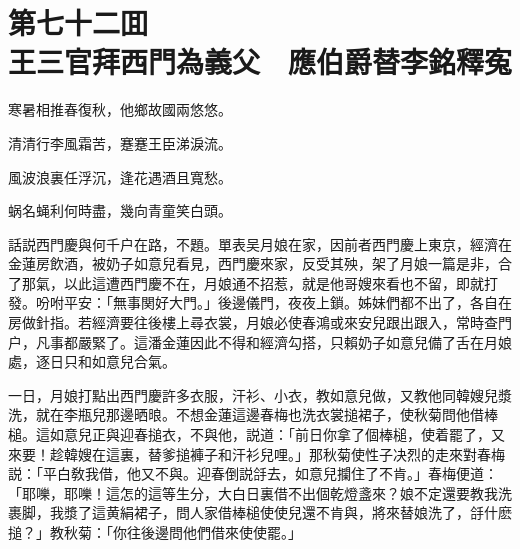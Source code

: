 
\chapter*{第七十二囬　\\王三官拜西門為義父　應伯爵替李銘釋寃}
\thispagestyle{empty}

\begin{myquote}
寒暑相推春復秋，他鄉故國兩悠悠。

清清行李風霜苦，蹇蹇王臣涕淚流。

風波浪裏任浮沉，逢花遇酒且寬愁。

蜗名蝇利何時盡，幾向青童笑白頭。
\end{myquote}

話説西門慶與何千户在路，不題。單表吴月娘在家，因前者西門慶上東京，經濟在金蓮房飲酒，被奶子如意兒看見，西門慶來家，反受其殃，架了月娘一篇是非，合了那氣，以此這遭西門慶不在，月娘通不招惹，就是他哥嫂來看也不留，即就打發。吩咐平安：「無事関好大門。」後邊儀門，夜夜上鎖。姊妹們都不出了，各自在房做針指。若經濟要往後樓上尋衣裳，月娘必使春鴻或來安兒跟出跟入，常時查門户，凡事都嚴緊了。這潘金蓮因此不得和經濟勾搭，只賴奶子如意兒備了舌在月娘處，逐日只和如意兒合氣。

一日，月娘打點出西門慶許多衣服，汗衫、小衣，教如意兒做，又教他同韓嫂兒漿洗，就在李瓶兒那邊晒㫰。不想金蓮這邊春梅也洗衣裳搥裙子，使秋菊問他借棒槌。這如意兒正與迎春搥衣，不與他，説道：「前日你拿了個棒槌，使着罷了，又來要！趁韓嫂在這裏，替爹搥褲子和汗衫兒哩。」那秋菊使性子决烈的走來對春梅説：「平白敎我借，他又不與。迎春倒説㧱去，如意兒攔住了不肯。」春梅便道：「耶嚛，耶嚛！這怎的這等生分，大白日裏借不出個乾燈盞來？娘不定還要教我洗裹脚，我漿了這黄絹裙子，問人家借棒槌使使兒還不肯與，將來替娘洗了，㧱什麽搥？」教秋菊：「你往後邊問他們借來使使罷。」

